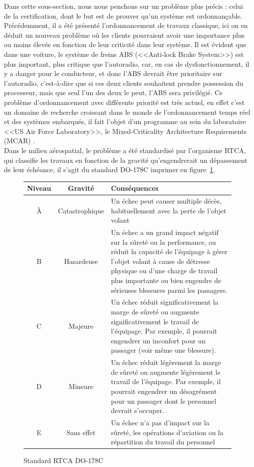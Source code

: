 \documentclass[a4paper]{report}
\theoremstyle{break}
\theoremstyle{breakplain}
\begin{document}
Dans cette sous-section, nous nous penchons sur un problème plus précis : celui de la certification, dont le but est de prouver qu'un système est ordonnançable.\\

Précédemment, il a été présenté l'ordonnancement de travaux classique, ici on en déduit un nouveau problème où les clients pourraient avoir une importance plus ou moins élevée en fonction de leur criticité dans leur système. 
Il est évident que dans une voiture, le système de freins ABS (<<Anti-lock Brake System>>) est plus important, plus critique que l'autoradio, car, en cas de dysfonctionnement, il y a danger pour le conducteur, et donc l'ABS devrait être prioritaire sur l'autoradio, c'est-à-dire que si ces deux clients souhaitent prendre possession du processeur, mais que seul l'un des deux le peut, l'ABS sera privilégié. Ce problème d'ordonnancement avec différente priorité est très actuel, en effet c'est un domaine de recherche croissant dans le monde de l'ordonnancement temps réel et des systèmes embarqués, il fait l'objet d'un programme au sein du laboratoire <<US Air Force Laboratory>>, le Mixed-Criticality Architecture Requirements (MCAR) \cite{de2009scheduling}.\\
Dans le milieu aérospatial, le problème a été standardisé par l'organisme RTCA, qui classifie les travaux en fonction de la gravité qu'engendrerait un dépassement de leur échéance, il s'agit du standard DO-178C imprimer en figure~\ref{do178}.\\
\begin{figure}[h]
\begin{tabularx}{\textwidth}{|c|c|X|}
\hline
Niveau & Gravité & Conséquences\\
\hline
À & Catastrophique & Un échec peut causer multiple décès, habituellement avec la perte de l'objet volant\\
\hline
B & Hasardeuse & Un échec a un grand impact négatif sur la sûreté ou la performance, ou réduit la capacité de l'équipage à gérer l'objet volant à cause de détresse physique ou d'une charge de travail plus importante ou bien engendre de sérieuses blessures parmi les passagers.\\
\hline
C & Majeure & Un échec réduit significativement la marge de sûreté ou augmente significativement le travail de l'équipage. Par exemple, il pourrait engendrer un inconfort pour un passager (voir même une blessure).\\
\hline
D & Mineure & Un échec réduit légèrement la marge de sûreté ou augmente légèrement le travail de l'équipage. Par exemple, il pourrait engendrer un désagrément pour un passager dont le personnel devrait s'occuper.\\
\hline
E & Sans effet & Un échec n'a pas d'impact sur la sûreté, les opérations d'aviation ou la répartition du travail du personnel\\
\hline
\end{tabularx}
\caption{Standard RTCA DO-178C \cite{nordhoff2012do178}}
\label{do178}
\end{figure}
\end{document}
